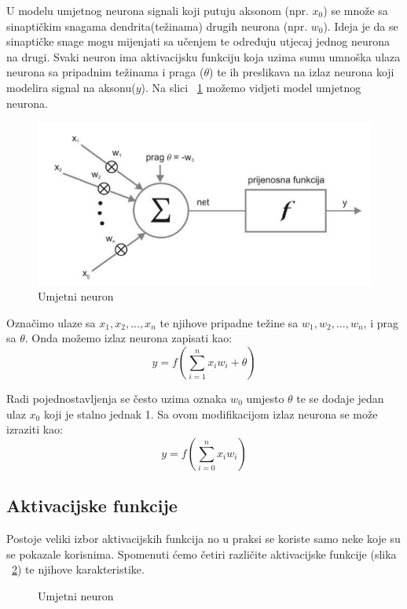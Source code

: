 \documentclass[times, utf8, zavrsni]{fer}
\begin{document}
U modelu umjetnog neurona signali koji putuju aksonom (npr. \textbf{$x_{0}$}) se množe sa sinaptičkim snagama dendrita(težinama) drugih neurona (npr. \textbf{$w_{0}$}). Ideja je da se sinaptičke snage mogu mijenjati sa učenjem te određuju utjecaj jednog neurona na drugi. Svaki neuron ima aktivacijsku funkciju koja uzima sumu umnoška ulaza neurona sa pripadnim težinama i praga ($\theta$) te ih preslikava na izlaz neurona koji modelira signal na aksonu($y$). Na slici ~\ref{fig:umj-neuron} možemo vidjeti model umjetnog neurona. 
\begin{figure}
    \centering
    \includegraphics[width=12cm]{img/umj-neuron.png}
    \caption{Umjetni neuron}
    \label{fig:umj-neuron}
\end{figure}

Označimo ulaze sa $x_{1},x_{2},...,x_{n}$ te njihove pripadne težine sa $w_{1},w_{2},...,w_{n}$, i prag sa $\theta$. Onda možemo izlaz neurona zapisati kao:
\begin{equation}
y = f(\displaystyle\sum_{i=1}^{n}x_iw_i + \theta)
\end{equation}

Radi pojednostavljenja se često uzima oznaka $w_0$ umjesto $\theta$ te se dodaje jedan ulaz $x_0$ koji je stalno jednak 1. Sa ovom modifikacijom izlaz neurona se može izraziti kao:
\begin{equation}
y = f(\displaystyle\sum_{i=0}^{n}x_iw_i)
\end{equation}
\subsection{Aktivacijske funkcije}\label{Aktivacijske funkcije}
Postoje veliki izbor aktivacijskih funkcija no u praksi se koriste samo neke koje su se pokazale korisnima. Spomenuti ćemo četiri različite aktivacijske funkcije (slika ~\ref{fig:aktivacijske-funkcije}) te njihove karakteristike.

\begin{figure}
\centering
{}
\caption{Umjetni neuron}
\label{fig:aktivacijske-funkcije}
\end{figure}
\end{document}
